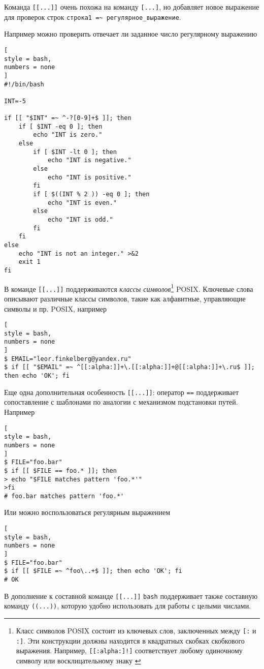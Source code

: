 \documentclass[%
	11pt,
	a4paper,
	utf8,
		]{article}
\begin{document}
Команда \verb|[[...]]| очень похожа на команду \verb|[...]|, но добавляет новое выражение для проверок строк \verb|строка1 =~ регулярное_выражение|.

Например можно проверить отвечает ли заданное число регулярному выражению
\begin{lstlisting}[
style = bash,
numbers = none
]
#!/bin/bash

INT=-5

if [[ "$INT" =~ ^-?[0-9]+$ ]]; then
    if [ $INT -eq 0 ]; then
        echo "INT is zero."
    else
        if [ $INT -lt 0 ]; then
            echo "INT is negative."
        else
            echo "INT is positive."
        fi
        if [ $((INT % 2 )) -eq 0 ]; then
            echo "INT is even."
        else
            echo "INT is odd."
        fi
    fi
else
    echo "INT is not an integer." >&2
    exit 1
fi
\end{lstlisting}

В команде \verb|[[...]]| поддерживаются \emph{классы символов}\footnote{Класс символов POSIX состоит из ключевых слов, заключенных между \texttt{[:} и \texttt{:]}. Эти конструкции должны находится в квадратных скобках скобкового выражения. Например, \texttt{[[:alpha:]!]} соответствует любому одиночному символу или восклицательному знаку \cite[]{robbins:vim-2013}} POSIX. Ключевые слова описывают различные классы символов, такие как алфавитные, управляющие символы и пр. POSIX, например
\begin{lstlisting}[
style = bash,
numbers = none
]
$ EMAIL="leor.finkelberg@yandex.ru"
$ if [[ "$EMAIL" =~ ^[[:alpha:]]+\.[[:alpha:]]+@[[:alpha:]]+\.ru$ ]]; then echo 'OK'; fi
\end{lstlisting}

Еще одна дополнительная особенность \verb|[[...]]|: оператор \verb|==| поддерживает сопоставление с шаблонами по аналогии с механизмом подстановки путей. Например
\begin{lstlisting}[
style = bash,
numbers = none
]
$ FILE="foo.bar"
$ if [[ $FILE == foo.* ]]; then
> echo "$FILE matches pattern 'foo.*'"
>fi
# foo.bar matches pattern 'foo.*'
\end{lstlisting}

Или можно воспользоваться регулярным выражением
\begin{lstlisting}[
style = bash,
numbers = none
]
$ FILE="foo.bar"
$ if [[ $FILE =~ ^foo\..+$ ]]; then echo 'OK'; fi
# OK
\end{lstlisting}

В дополнение к составной команде \verb|[[...]]| \texttt{bash} поддерживает также составную команду \verb|((...))|, которую удобно использовать для работы с целыми числами.
\end{document}
